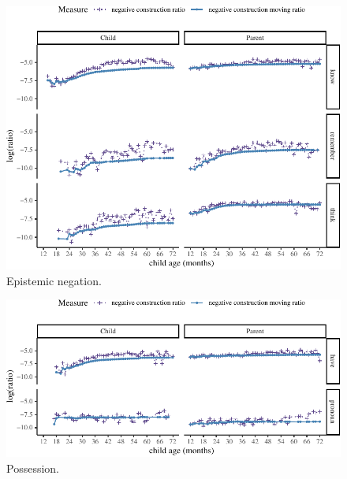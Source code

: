 \documentclass[10pt, letterpaper]{article}
\newenvironment{CodeChunk}{}{}
\begin{document}
\begin{figure}[h!]

\begin{CodeChunk}


\begin{center}\includegraphics{figs/epistemic-1} \end{center}

\end{CodeChunk}
\caption[This image spans both columns]{Epistemic negation.}\label{fig:epistemic}
\end{figure}

\begin{figure}[h!]

\begin{CodeChunk}


\begin{center}\includegraphics{figs/possession-1} \end{center}

\end{CodeChunk}
\caption[This image spans both columns]{Possession.}\label{fig:possession}
\end{figure}
\end{document}

